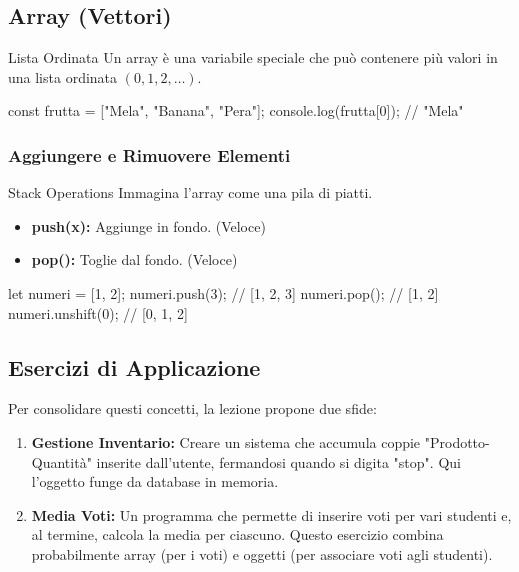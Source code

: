 \subsection{Array (Vettori)}
\begin{concept}{Lista Ordinata}
Un array è una variabile speciale che può contenere più valori in una lista ordinata $(0, 1, 2, \dots)$.
\end{concept}
\begin{jsbox}
const frutta = ["Mela", "Banana", "Pera"];
console.log(frutta[0]); // "Mela"
\end{jsbox}

\subsubsection{Aggiungere e Rimuovere Elementi}
\begin{concept}{Stack Operations}
Immagina l'array come una pila di piatti.
\begin{itemize}
    \item \textbf{push(x):} Aggiunge in fondo. (Veloce)
    \item \textbf{pop():} Toglie dal fondo. (Veloce)
\end{itemize}
\end{concept}
\begin{jsbox}
let numeri = [1, 2];
numeri.push(3);    // [1, 2, 3]
numeri.pop();      // [1, 2]
numeri.unshift(0); // [0, 1, 2]
\end{jsbox}

\subsection{Esercizi di Applicazione}
Per consolidare questi concetti, la lezione propone due sfide:
\begin{enumerate}
    \item \textbf{Gestione Inventario:} Creare un sistema che accumula coppie "Prodotto-Quantità" inserite dall'utente, fermandosi quando si digita "stop". Qui l'oggetto funge da database in memoria.
    \item \textbf{Media Voti:} Un programma che permette di inserire voti per vari studenti e, al termine, calcola la media per ciascuno. Questo esercizio combina probabilmente array (per i voti) e oggetti (per associare voti agli studenti).
\end{enumerate}
